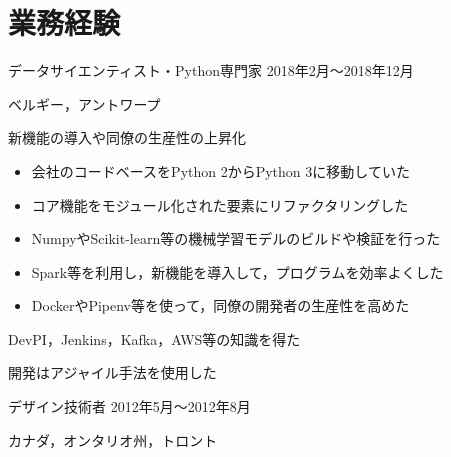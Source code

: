 \documentclass[10pt, a4paper]{article}
\begin{document}
\section{業務経験}
\begin{outerlist}
\item[\href{https://sentiance.com}{\parbox[t]{3cm}{\raggedleft Sentiance有限会社}}]{データサイエンティスト・Python専門家} \hfill {2018年2月〜2018年12月}

\hfill ベルギー，アントワープ
    \begin{innerlist}
    \item 新機能の導入や同僚の生産性の上昇化
    \begin{itemize}
        \item 会社のコードベースをPython 2からPython 3に移動していた
        \item コア機能をモジュール化された要素にリファクタリングした
        \item NumpyやScikit-learn等の機械学習モデルのビルドや検証を行った
        \item Spark等を利用し，新機能を導入して，プログラムを効率よくした
        \item DockerやPipenv等を使って，同僚の開発者の生産性を高めた
    \end{itemize}
    \item DevPI，Jenkins，Kafka，AWS等の知識を得た
    \item 開発はアジャイル手法を使用した
    \end{innerlist}

\item[\href{http://starquip.com/}{\parbox[t]{3cm}{\raggedleft Starquip Integrated Systems有限会社}}]{デザイン技術者} \hfill {2012年5月〜2012年8月}

\vspace{-\baselineskip}    
\hfill カナダ，オンタリオ州，トロント


\end{outerlist}
\end{document}
